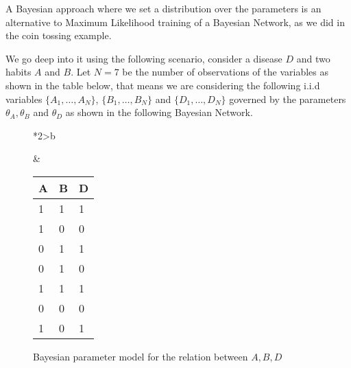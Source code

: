 


A Bayesian approach where we set a distribution over the parameters is an
alternative to Maximum Likelihood training of a Bayesian Network, as we did in
the coin tossing example.

We go deep into it using the following scenario, consider a disease
\(D\) and two habits \(A\) and \(B\). Let \(N = 7\) be the number of observations of the variables as shown in the table below, that means we are considering the following i.i.d variables \(\{A_{1},\dots, A_{N}\}\), \(\{B_{1},\dots,B_{N}\}\) and \(\{D_{1},\dots, D_{N}\}\) governed by the parameters \(\theta_{A}, \theta_{B}\) and \(\theta_{D}\) as shown in the following Bayesian Network.

\begin{figure}[!ht]
  \begin{tabular}{*{2}{>{\centering\arraybackslash}b{}}}
  \centering
  \begin{tikzpicture}[
    node distance=1cm and 0.5cm,
    mynode/.style={draw,circle,text width=0.5cm,align=center}
    ]

    \node[mynode] (d) {\(D_{n}\)};
    \node[mynode, above left=of d] (a) {\(A_{n}\)};
    \node[mynode, above right=of d] (b) {\(B_{n}\)};
    \node[mynode, above=of a] (ta) {\(\theta_{A}\)};
    \node[mynode, above=of b] (tb) {\(\theta_{B}\)};
    \node[mynode, below=of d] (td) {\(\theta_{D}\)};
    \plate{} {(d)(a)(b)} {\(1\dots N\)}; %
    \path (a) edge[-latex] (d)
    (b) edge[-latex] (d)
    (ta) edge[-latex] (a)
    (tb) edge[-latex] (b)
    (td) edge[-latex] (d)
    ;

  \end{tikzpicture}
    \caption{Bayesian parameter model for the relation between \(A,B,D\)}\label{fig:bayesian_example}
    &
      \renewcommand{\arraystretch}{1.3}
      \begin{tabular}{|l|l|l|}
    \hline
    A & B & D \\ \hline
    1 & 1 & 1 \\ \hline
    1 & 0 & 0 \\ \hline
    0 & 1 & 1 \\ \hline
    0 & 1 & 0 \\ \hline
    1 & 1 & 1 \\ \hline
    0 & 0 & 0 \\ \hline
    1 & 0 & 1 \\ \hline
  \end{tabular}
\end{tabular}
\end{figure}

